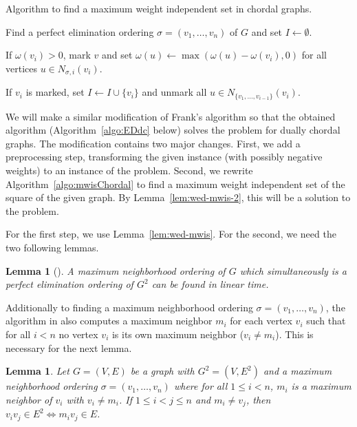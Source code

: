 \documentclass[]{elsarticle}
\newtheorem{lemma}[theorem]{Lemma}
\def\mwis{{\sc{MWIS }}}
\def\minwed{{\sc{Min-WED }}}
\begin{document}
\begin{algorithm}
\caption{\cite{Frank} Algorithm to find a maximum weight independent set in chordal graphs.}\label{algo:mwisChordal}


Find a perfect elimination ordering $\sigma = (v_1,\ldots,v_n)$ of $G$ and set $I \leftarrow \emptyset$. \label{line:mwisChorFindPEO}

{
    If $\omega(v_i) > 0$, mark $v$ and set $\omega(u) \leftarrow  \max(\omega(u) - \omega(v_i), 0)$ for all vertices $u \in N_{\sigma,i}(v_i)$.
}

{
    If $v_i$ is marked, set $I \leftarrow I \cup \{v_i\}$ and unmark all $u \in N_{\{v_1,\ldots, v_{i-1}\}}(v_i)$.
}

\end{algorithm}


We will make a similar modification of Frank's algorithm so that the obtained algorithm (Algorithm~\ref{algo:EDdc} below) solves the \minwed problem for dually chordal graphs. 
The modification contains two major changes. 
First, we add a preprocessing step, transforming the given \minwed instance (with possibly negative weights) to an instance of the \mwis problem. 
Second, we rewrite Algorithm~\ref{algo:mwisChordal} to find a maximum weight independent set of the square of the given graph. 
By Lemma~\ref{lem:wed-mwis-2}, this will be a solution to the \minwed problem.

For the first step, we use Lemma~\ref{lem:wed-mwis}. 
For the second, we need the two following lemmas.

\begin{lemma}[\cite{BCD98}]\label{lem:MNO_linear}
    A maximum neighborhood ordering of $G$ which simultaneously is a perfect elimination ordering of $G^2$ can be found in linear time.
\end{lemma}

Additionally to finding a maximum neighborhood ordering $\sigma=(v_1,\ldots,v_n)$, the algorithm in \cite{BCD98} also computes a maximum neighbor $m_i$ for each vertex $v_i$ such that for all $i < n$ no vertex $v_i$ is its own maximum neighbor ($v_i \neq m_i$). 
This is necessary for the next lemma.

\begin{lemma}\label{lem:ijInE_iff_mjInE2}
Let $G=(V,E)$ be a graph with $G^2=(V,E^2)$ and a maximum neighborhood ordering $\sigma=(v_1, \ldots, v_n)$ where for all $1\le i< n$, $m_i$ is a maximum neighbor of $v_i$ with $v_i \neq m_i$. 
If $1 \leq i < j \leq n$ and $m_i \neq v_j$, then $v_iv_j \in E^2 \Leftrightarrow m_iv_j \in E$.
\end{lemma}
\end{document}
